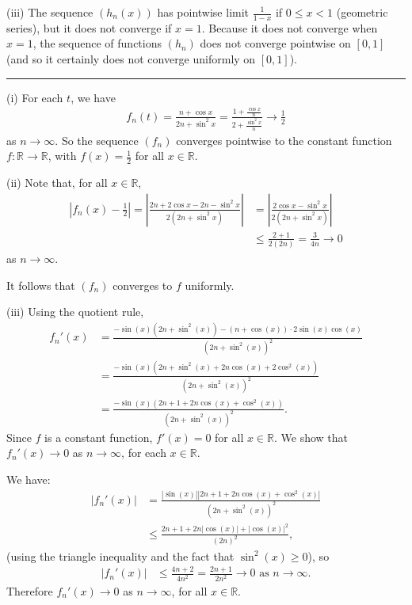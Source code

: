\documentclass[letterpaper,10pt,english]{jupyterBook}
\begin{document}
\sphinxAtStartPar
(iii) The sequence \((h_n(x))\) has pointwise limit \(\frac{1}{1-x}\) if \(0\leq x<1\) (geometric series), but it does not converge if \(x=1\). Because it does not converge when \(x=1\), the sequence of functions \((h_n)\) does not converge pointwise  on \([0,1]\) (and so it certainly does not converge uniformly on \([0,1]\)).


\bigskip\hrule\bigskip


\sphinxAtStartPar
{\hyperref[\detokenize{Problems:id58}]{}}
(i) For each \(t\), we have
\begin{equation*}
\begin{split}
f_n(t) = \frac{n+\cos x}{2n+\sin^2 x} = \frac{1+\frac{\cos x}{n}}{2+\frac{\sin^2 x}{n}} \rightarrow \frac{1}{2}
\end{split}
\end{equation*}
\sphinxAtStartPar
as \(n\rightarrow \infty\). So the sequence \((f_n)\) converges pointwise to the constant function \(f:\mathbb{R}\to\mathbb{R}\), with \(f(x)=\frac{1}{2}\) for all \(x\in\mathbb{R}\).

\sphinxAtStartPar
(ii) Note that, for all \(x\in\mathbb{R}\),
\begin{align*}
\left|f_n(x) - \frac{1}{2}\right| =  \left| \frac{2n+2\cos x -2n -\sin^2 x}{2(2n+\sin^2 x)} \right| 
&= \left| \frac{2\cos x -\sin^2 x}{2(2n+\sin^2 x)} \right| \\
&\leq \frac{2+1}{2(2n)}=\frac{3}{4n} \rightarrow 0 
\end{align*}
\sphinxAtStartPar
as \(n\rightarrow \infty\).

It follows that \((f_n)\) converges to \(f\) uniformly.

\sphinxAtStartPar
(iii) Using the quotient rule,
\begin{align*}
f_n'(x) &= \frac{-\sin(x)(2n+\sin^2(x))-(n+\cos(x))\cdot 2\sin(x)\cos(x)}{\left(2n+\sin^2(x)\right)^2} \\
&= \frac{-\sin(x)\left(2n+\sin^2(x)+2n\cos(x)+2\cos^2(x)\right)}{\left(2n+\sin^2(x)\right)^2} \\
&= \frac{-\sin(x)\left(2n+1+2n\cos(x)+\cos^2(x)\right)}{\left(2n+\sin^2(x)\right)^2}.
\end{align*}
\sphinxAtStartPar
Since \(f\) is a constant function, \(f'(x)=0\) for all \(x\in\mathbb{R}\). We show that \(f_n'(x)\rightarrow 0\) as \(n\rightarrow\infty\), for each \(x\in\mathbb{R}\).

We have:
\begin{align*}
|f_n'(x)| &= \frac{|\sin(x)|\left|2n+1+2n\cos(x)+\cos^2(x)\right|}{\left(2n+\sin^2(x)\right)^2} \\
&\leq \frac{2n+1+2n|\cos(x)|+|\cos(x)|^2}{\left(2n\right)^2},
\end{align*}
\sphinxAtStartPar
(using the triangle inequality and the fact that \(\sin^2(x)\geq 0\)), so
\begin{align*}
|f_n'(x)| &\leq \frac{4n+2}{4n^2} = \frac{2n+1}{2n^2} \rightarrow 0 \text{ as } n\rightarrow \infty.
\end{align*}
\sphinxAtStartPar
Therefore \(f_n'(x)\rightarrow 0\) as \(n\rightarrow \infty\), for all \(x\in\mathbb{R}\).
\end{document}
